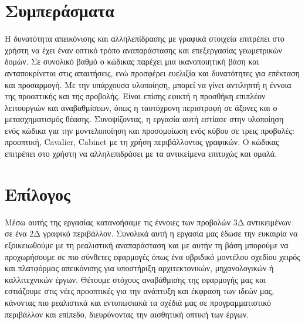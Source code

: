 \chapter*{Συμπεράσματα}
Η δυνατότητα απεικόνισης και αλληλεπίδρασης με γραφικά στοιχεία επιτρέπει στο χρήστη να έχει έναν οπτικό τρόπο αναπαράστασης και επεξεργασίας γεωμετρικών δομών. Σε συνολικό βαθμό ο κώδικας παρέχει μια ικανοποιητική βάση και ανταποκρίνεται στις απαιτήσεις, ενώ προσφέρει ευελιξία και δυνατότητες για επέκταση και προσαρμογή. Με την υπάρχουσα υλοποίηση, μπορεί να γίνει αντιληπτή η έννοια της προοπτικής και της προβολής. Είναι επίσης εφικτή η προσθήκη επιπλέον λειτουργιών και αναβαθμίσεων, όπως η ταυτόχρονη περιστροφή σε άξονες και ο μετασχηματισμός θέασης. Συνοψίζοντας, η εργασία αυτή εστίασε στην υλοποίηση ενός κώδικα για την μοντελοποίηση και προσομοίωση ενός κύβου σε τρεις προβολές: προοπτική, Cavalier, Cabinet με τη χρήση περιβάλλοντος γραφικών. Ο κώδικας επιτρέπει στο χρήστη να αλληλεπιδράσει με τα αντικείμενα επιτυχώς και ομαλά.  

\chapter*{Επίλογος}
Mέσω αυτής της εργασίας κατανοήσαμε τις έννοιες των προβολών 3Δ αντικειμένων σε ένα 2Δ γραφικό περιβάλλον. Συνολικά αυτή η εργασία μας έδωσε την ευκαιρία να εξοικειωθούμε με τη ρεαλιστική αναπαράσταση και με αυτήν τη βάση μπορούμε να προχωρήσουμε σε πιο σύνθετες εφαρμογές όπως ένα υβριδικό μοντέλου σχεδίου χειρός και πλατφόρμας απεικόνισης για υποστήριξη αρχιτεκτονικών, μηχανολογικών ή καλλιτεχνικών έργων.
Θέτουμε στόχους αναβάθμισης της εφαρμογής μας και εστιάζουμε στις νέες προοπτικές για την ανάπτυξη και έκφραση των ιδεών μας, κάνοντας πιο ρεαλιστικά και εντυπωσιακά τα σχέδιά μας σε προγραμματιστικό περιβάλλον και επίπεδο, διευρύνοντας την αισθητική οπτική των έργων. 
